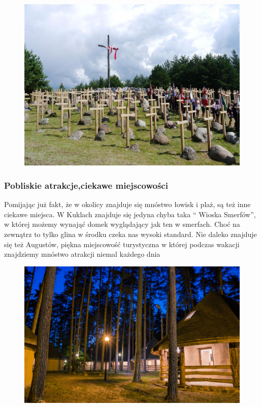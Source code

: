 \documentclass[]{beamer}
\begin{document}
{
\begin{figure}[here]
\begin{center}
\includegraphics[scale=0.3]{giby4.jpg}
\end{center}
\end{figure}
}
\frame
{
\frametitle{Pobliskie atrakcje,ciekawe miejscowości}
Pomijając już fakt, że w okolicy znajduje się mnóstwo łowisk i plaż, są też inne ciekawe miejsca.
W Kuklach znajduje się jedyna chyba taka `` Wioska Smerfów'', w której możemy wynająć domek wyglądający jak ten w smerfach. Choć na zewnątrz to tylko glina w środku czeka nas wysoki standard. Nie daleko znajduje się też Augustów, piękna miejscowość turystyczna w której podczas wakacji znajdziemy mnóstwo atrakcji niemal każdego dnia}
\frame
{
\begin{figure}[here]
\begin{center}
\includegraphics[scale=1]{giby5.jpg}
\end{center}
\end{figure}
}
\end{document}
